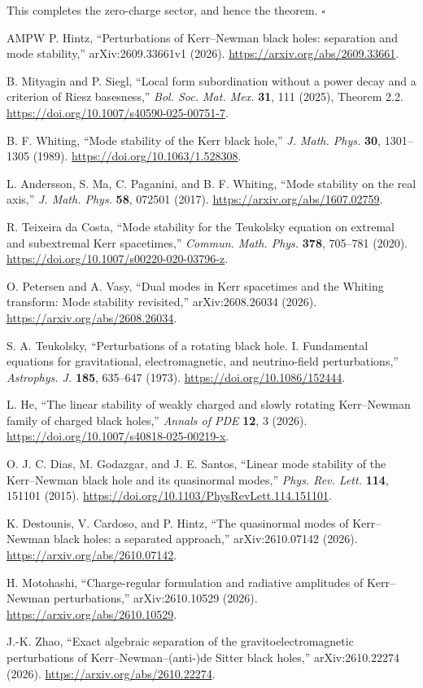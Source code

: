 \documentclass[
  10pt,
  a4paper,
]{article}
\begin{document}
This completes the zero-charge sector, and hence the theorem.
\(\square\)

\begin{thebibliography}{AMPW}
 P. Hintz, ``Perturbations of Kerr--Newman black holes:
separation and mode stability,'' arXiv:2609.33661v1 (2026).
\url{https://arxiv.org/abs/2609.33661}.

 B. Mityagin and P. Siegl, ``Local form
subordination without a power decay and a criterion of Riesz
basesness,'' \emph{Bol. Soc. Mat. Mex.} \textbf{31}, 111 (2025),
Theorem 2.2. \url{https://doi.org/10.1007/s40590-025-00751-7}.

 B. F. Whiting, ``Mode stability of the Kerr black hole,''
\emph{J. Math. Phys.} \textbf{30}, 1301--1305 (1989).
\url{https://doi.org/10.1063/1.528308}.

 L. Andersson, S. Ma, C. Paganini, and B. F. Whiting,
``Mode stability on the real axis,'' \emph{J. Math. Phys.} \textbf{58},
072501 (2017). \url{https://arxiv.org/abs/1607.02759}.

 R. Teixeira da Costa, ``Mode stability for the
Teukolsky equation on extremal and subextremal Kerr spacetimes,''
\emph{Commun. Math. Phys.} \textbf{378}, 705--781 (2020).
\url{https://doi.org/10.1007/s00220-020-03796-z}.

 O. Petersen and A. Vasy, ``Dual modes in Kerr
spacetimes and the Whiting transform: Mode stability revisited,''
arXiv:2608.26034 (2026). \url{https://arxiv.org/abs/2608.26034}.

 S. A. Teukolsky, ``Perturbations of a rotating black
hole. I. Fundamental equations for gravitational, electromagnetic,
and neutrino-field perturbations,'' \emph{Astrophys. J.}
\textbf{185}, 635--647 (1973). \url{https://doi.org/10.1086/152444}.

 L. He, ``The linear stability of weakly charged and
slowly rotating Kerr--Newman family of charged black holes,''
\emph{Annals of PDE} \textbf{12}, 3 (2026).
\url{https://doi.org/10.1007/s40818-025-00219-x}.

 O. J. C. Dias, M. Godazgar, and J. E. Santos,
``Linear mode stability of the Kerr--Newman black hole and its
quasinormal modes,'' \emph{Phys. Rev. Lett.} \textbf{114}, 151101
(2015). \url{https://doi.org/10.1103/PhysRevLett.114.151101}.

 K. Destounis, V. Cardoso, and P. Hintz,
``The quasinormal modes of Kerr--Newman black holes: a separated approach,''
arXiv:2610.07142 (2026). \url{https://arxiv.org/abs/2610.07142}.

 H. Motohashi, ``Charge-regular formulation and radiative
amplitudes of Kerr--Newman perturbations,'' arXiv:2610.10529 (2026).
\url{https://arxiv.org/abs/2610.10529}.

 J.-K. Zhao, ``Exact algebraic separation of the
gravitoelectromagnetic perturbations of Kerr--Newman--(anti-)de Sitter
black holes,'' arXiv:2610.22274 (2026).
\url{https://arxiv.org/abs/2610.22274}.
\end{thebibliography}
\end{document}
